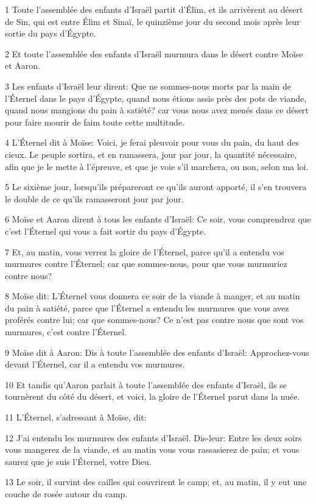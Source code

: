\par 1 Toute l'assemblée des enfants d'Israël partit d'Élim, et ils arrivèrent au désert de Sin, qui est entre Élim et Sinaï, le quinzième jour du second mois après leur sortie du pays d'Égypte.
\par 2 Et toute l'assemblée des enfants d'Israël murmura dans le désert contre Moïse et Aaron.
\par 3 Les enfants d'Israël leur dirent: Que ne sommes-nous morts par la main de l'Éternel dans le pays d'Égypte, quand nous étions assis près des pots de viande, quand nous mangions du pain à satiété? car vous nous avez menés dans ce désert pour faire mourir de faim toute cette multitude.
\par 4 L'Éternel dit à Moïse: Voici, je ferai pleuvoir pour vous du pain, du haut des cieux. Le peuple sortira, et en ramassera, jour par jour, la quantité nécessaire, afin que je le mette à l'épreuve, et que je voie s'il marchera, ou non, selon ma loi.
\par 5 Le sixième jour, lorsqu'ils prépareront ce qu'ils auront apporté, il s'en trouvera le double de ce qu'ils ramasseront jour par jour.
\par 6 Moïse et Aaron dirent à tous les enfants d'Israël: Ce soir, vous comprendrez que c'est l'Éternel qui vous a fait sortir du pays d'Égypte.
\par 7 Et, au matin, vous verrez la gloire de l'Éternel, parce qu'il a entendu vos murmures contre l'Éternel; car que sommes-nous, pour que vous murmuriez contre nous?
\par 8 Moïse dit: L'Éternel vous donnera ce soir de la viande à manger, et au matin du pain à satiété, parce que l'Éternel a entendu les murmures que vous avez proférés contre lui; car que sommes-nous? Ce n'est pas contre nous que sont vos murmures, c'est contre l'Éternel.
\par 9 Moïse dit à Aaron: Dis à toute l'assemblée des enfants d'Israël: Approchez-vous devant l'Éternel, car il a entendu vos murmures.
\par 10 Et tandis qu'Aaron parlait à toute l'assemblée des enfants d'Israël, ils se tournèrent du côté du désert, et voici, la gloire de l'Éternel parut dans la nuée.
\par 11 L'Éternel, s'adressant à Moïse, dit:
\par 12 J'ai entendu les murmures des enfants d'Israël. Dis-leur: Entre les deux soirs vous mangerez de la viande, et au matin vous vous rassasierez de pain; et vous saurez que je suis l'Éternel, votre Dieu.
\par 13 Le soir, il survint des cailles qui couvrirent le camp; et, au matin, il y eut une couche de rosée autour du camp.
